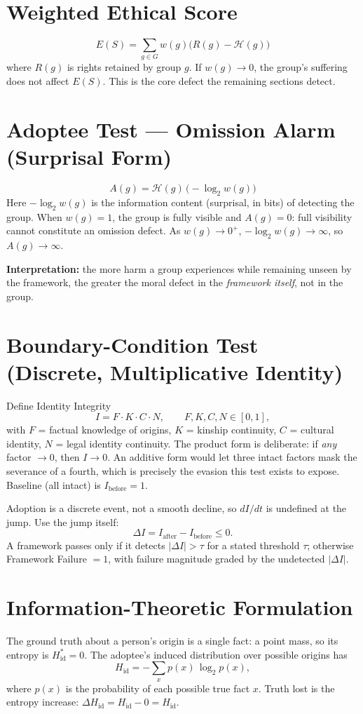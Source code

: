 \documentclass[12pt,a4paper]{article}
\begin{document}
\section{Weighted Ethical Score}
\[
E(S) = \sum_{g \in G} w(g)\bigl( R(g) - \mathcal{H}(g) \bigr)
\]
where $R(g)$ is rights retained by group $g$. If $w(g)\to 0$, the group's
suffering does not affect $E(S)$. This is the core defect the remaining
sections detect.

\section{Adoptee Test --- Omission Alarm (Surprisal Form)}
\[
A(g) = \mathcal{H}(g)\,\bigl(-\log_2 w(g)\bigr)
\]
Here $-\log_2 w(g)$ is the information content (surprisal, in bits) of
detecting the group. When $w(g)=1$, the group is fully visible and $A(g)=0$:
full visibility cannot constitute an omission defect. As $w(g)\to 0^{+}$,
$-\log_2 w(g)\to\infty$, so $A(g)\to\infty$.

\noindent\textbf{Interpretation:} the more harm a group experiences while
remaining unseen by the framework, the greater the moral defect in the
\emph{framework itself}, not in the group.

\section{Boundary-Condition Test (Discrete, Multiplicative Identity)}
Define Identity Integrity
\[
I = F \cdot K \cdot C \cdot N, \qquad F,K,C,N \in [0,1],
\]
with $F$ = factual knowledge of origins, $K$ = kinship continuity,
$C$ = cultural identity, $N$ = legal identity continuity. The product form is
deliberate: if \emph{any} factor $\to 0$, then $I \to 0$. An additive form
would let three intact factors mask the severance of a fourth, which is
precisely the evasion this test exists to expose. Baseline (all intact) is
$I_{\text{before}} = 1$.

Adoption is a discrete event, not a smooth decline, so $dI/dt$ is undefined at
the jump. Use the jump itself:
\[
\Delta I = I_{\text{after}} - I_{\text{before}} \le 0 .
\]
A framework passes only if it detects $|\Delta I| > \tau$ for a stated
threshold $\tau$; otherwise Framework Failure $= 1$, with failure magnitude
graded by the undetected $|\Delta I|$.

\section{Information-Theoretic Formulation}
The ground truth about a person's origin is a single fact: a point mass, so
its entropy is $H_{\mathrm{id}}^{*}=0$. The adoptee's induced distribution over
possible origins has
\[
H_{\mathrm{id}} = -\sum_{x} p(x)\,\log_2 p(x),
\]
where $p(x)$ is the probability of each possible true fact $x$. Truth lost is
the entropy increase: $\Delta H_{\mathrm{id}} = H_{\mathrm{id}} - 0 =
H_{\mathrm{id}}$.
\end{document}
